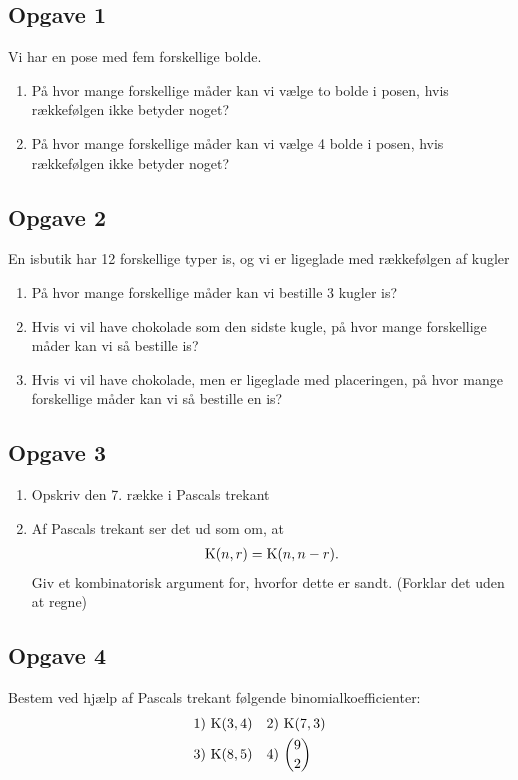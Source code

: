 \subsection*{Opgave 1}
Vi har en pose med fem forskellige bolde. 
\begin{enumerate}[label=\roman*)]
	\item På hvor mange forskellige måder kan vi vælge to bolde i posen, hvis rækkefølgen ikke betyder noget?
	\item På hvor mange forskellige måder kan vi vælge 4 bolde i posen, hvis rækkefølgen ikke betyder noget?
\end{enumerate}

\subsection*{Opgave 2}
En isbutik har 12 forskellige typer is, og vi er ligeglade med rækkefølgen af kugler
\begin{enumerate}[label=\roman*)]
	\item På hvor mange forskellige måder kan vi bestille 3 kugler is?
	\item Hvis vi vil have chokolade som den sidste kugle, på hvor mange forskellige måder kan vi så bestille is?
	\item Hvis vi vil have chokolade, men er ligeglade med placeringen, på hvor mange forskellige måder kan vi så
	 bestille en is?
\end{enumerate}

\subsection*{Opgave 3}
\begin{enumerate}[label=\roman*)]
	\item Opskriv den 7. række i Pascals trekant
	\item Af Pascals trekant ser det ud som om, at 
	\begin{align*}
		\textnormal{K}(n,r) = \textnormal{K}(n,n-r).
	\end{align*}
	Giv et kombinatorisk argument for, hvorfor dette er sandt. (Forklar det uden at regne)
\end{enumerate}

\subsection*{Opgave 4}
Bestem ved hjælp af Pascals trekant følgende binomialkoefficienter:
\begin{align*}
	&1) \ \textnormal{K}(3,4)  &&2) \ \textnormal{K}(7,3) \\
	&3) \ \textnormal{K}(8,5)  &&4) \ \binom{9}{2} \\
\end{align*}


